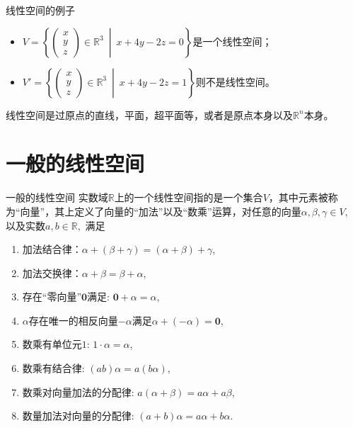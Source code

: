 \documentclass[10pt]{beamer}
\begin{document}

\begin{frame}

\begin{block}{线性空间的例子}
\begin{itemize}
\item \(\displaystyle V = \left\{ \begin{pmatrix}
x \\ y \\ z\end{pmatrix} \in \mathbb{R}^3 \ \middle| \ x + 4y -2z = 0\right\} \)是一个线性空间；
\item \(\displaystyle V' = \left\{ \begin{pmatrix}
x \\ y \\ z\end{pmatrix} \in \mathbb{R}^3 \ \middle| \ x + 4y -2z = 1\right\} \)则不是线性空间。
\end{itemize}
\end{block}

\vspace{2em}
\pause

线性空间是{\color{red}过原点}的直线，平面，超平面等，或者是原点本身以及$\mathbb{R}^n$本身。

\end{frame}


\section{一般的线性空间}


\begin{frame}

\begin{block}{一般的线性空间}
实数域$\mathbb{R}$上的一个线性空间指的是一个集合$V$，其中元素被称为``向量''，其上定义了向量的``加法''以及``数乘''运算，对任意的向量$\alpha,\beta,\gamma \in V,$ 以及实数$a,b
 \in \mathbb{R},$ 满足
\begin{enumerate}
\item 加法结合律：$\alpha + (\beta + \gamma) = (\alpha + \beta) + \gamma$,
\item 加法交换律：$\alpha + \beta = \beta + \alpha$,
\item 存在``零向量''$\mathbf{0}$满足: $\mathbf{0} + \alpha = \alpha$,
\item $\alpha$存在唯一的相反向量$-\alpha$满足$\alpha + (-\alpha) = \mathbf{0}$,
\item 数乘有单位元$1$: $1\cdot\alpha = \alpha$,
\item 数乘有结合律: $(ab)\alpha = a(b\alpha)$,
\item 数乘对向量加法的分配律: $a(\alpha + \beta) = a\alpha + a\beta$,
\item 数量加法对向量的分配律: $(a+b)\alpha = a\alpha + b\alpha$.
\end{enumerate}
\end{block}

\end{frame}
\end{document}
